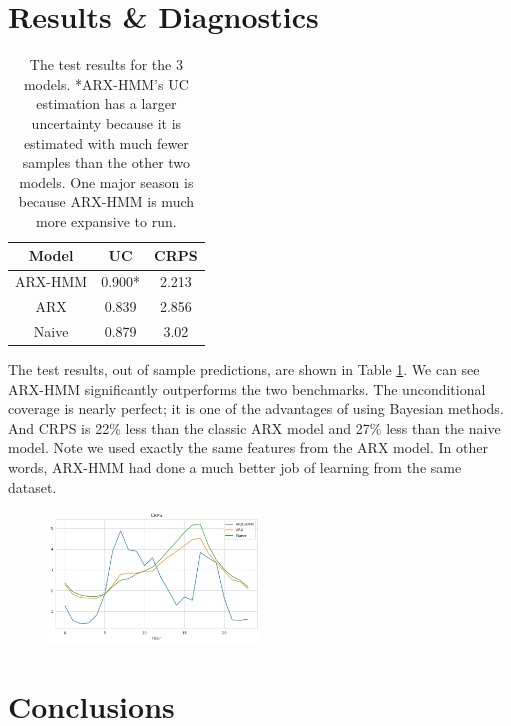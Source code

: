 \documentclass[11pt, letterpaper, journal]{IEEEtran}
\begin{document}
\section{Results \& Diagnostics}
\begin{table}
\begin{center}
\begin{tabular}{||c | c c||} 
    \hline
    Model & UC & CRPS \\ [0.5ex] 
    \hline\hline
    ARX-HMM & 0.900* & 2.213 \\
    \hline
    ARX & 0.839 & 2.856 \\
    \hline
    Naive & 0.879 & 3.02 \\
    \hline
\end{tabular}
\caption{The test results for the 3 models. *ARX-HMM's UC estimation has a larger uncertainty because it is estimated with much fewer samples than the other two models. One major season is because ARX-HMM is much more expansive to run.}
\label{tab:test_results}
\end{center}
\end{table}

The test results, out of sample predictions, are shown in Table \ref{tab:test_results}. We can see ARX-HMM significantly outperforms the two benchmarks. The unconditional coverage is nearly perfect; it is one of the advantages of using Bayesian methods. And CRPS is 22\% less than the classic ARX model and 27\% less than the naive model. Note we used exactly the same features from the ARX model. In other words, ARX-HMM had done a much better job of learning from the same dataset.

\begin{figure}[h]
\centering
\includegraphics[width=0.5\textwidth]{5.a.png}
\caption{}
\label{fig:HMM_graph}
\end{figure}


\section{Conclusions}

\printbibliography[heading=bibintoc, title={References}]
\end{document}
